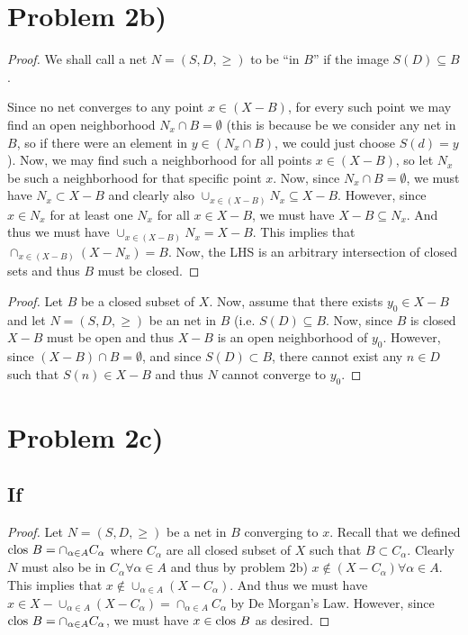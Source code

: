 \section*{Problem 2b)}
\begin{proof}
We shall call a net $N=(S,D,\geq)$ to be ``in $B$'' if the image $S(D)\subseteq B$.

Since no net converges to any point $x\in (X-B)$, for every such point we may find an open neighborhood $N_x \cap B = \emptyset$ (this is because be we consider any net in $B$, so if there were an element in $y\in(N_x\cap B)$, we could just choose $S(d)=y$). Now, we may find such a neighborhood for all points $x\in (X-B)$, so let $N_x$ be such a neighborhood for that specific point $x$. Now, since $N_x \cap B = \emptyset$, we must have $N_x\subset X-B$ and clearly also $\cup_{x\in(X-B)} N_x\subseteq X-B$. However, since $x\in N_x$ for at least one $N_x$ for all $x\in X-B$, we must have $X-B\subseteq N_x$. And thus we must have $\cup_{x\in(X-B)} N_x = X-B$. This implies that $\cap_{x\in(X-B)} (X-N_x) = B$. Now, the LHS is an arbitrary intersection of closed sets and thus $B$ must be closed. 
\end{proof}
\begin{proof}
Let $B$ be a closed subset of $X$. Now, assume that there exists $y_0\in X-B$ and let  $N=(S,D,\geq)$  be an net in $B$ (i.e. $S(D)\subseteq B$. Now, since $B$ is closed $X-B$ must be open and thus $X-B$ is an open neighborhood of $y_0$. However, since $(X-B)\cap B=\emptyset$, and since $S(D)\subset B$, there cannot exist any $n\in D$ such that $S(n)\in X-B$ and thus $N$ cannot converge to $y_0$.
\end{proof}
\section*{Problem 2c)}
\subsection*{If}
\begin{proof}
Let $N=(S,D,\geq)$ be a net in $B$ converging to $x$. Recall that we defined $\text{clos } B = \cap_{\alpha \in A} C_\alpha$ where $C_\alpha$ are all closed subset of $X$ such that $B \subset C_\alpha$. Clearly $N$ must also be in $C_\alpha \forall \alpha \in A$ and thus by problem 2b) $x\notin (X-C_\alpha) \forall \alpha \in A$. This implies that $x \notin \cup_{\alpha \in A} (X-C_\alpha)$. And thus we must have $x \in X-\cup_{\alpha \in A} (X - C_\alpha) = \cap_{\alpha \in A} C_\alpha$
by De Morgan's Law. However, since $\text{clos } B = \cap_{\alpha \in A} C_\alpha$, we must have $x\in \text{clos } B$ as desired.
\end{proof}
